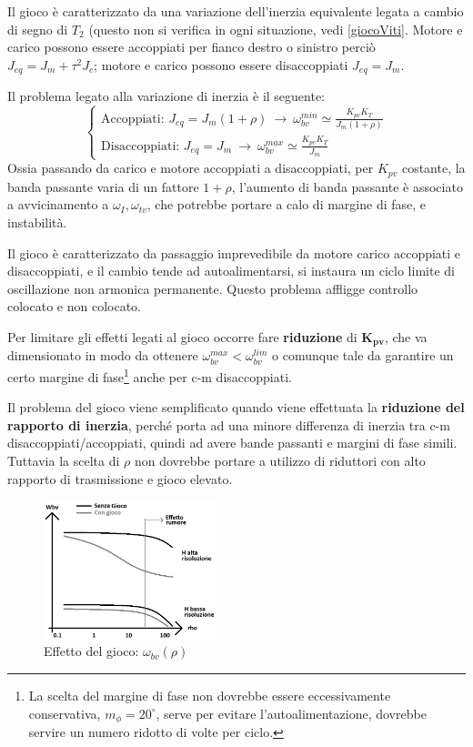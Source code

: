 Il gioco è caratterizzato da una variazione dell'inerzia equivalente legata a cambio di segno di \(T_2\) (questo non si verifica in ogni situazione, vedi \ref{giocoViti}. 
Motore e carico possono essere accoppiati per fianco destro o sinistro perciò \(J_{eq} = J_m + \tau^2 J_c\); motore e carico possono essere disaccoppiati \(J_{eq} = J_m\).

Il problema legato alla variazione di inerzia è il seguente:
\[
\begin{cases}
    \text{Accoppiati: } J_{eq} = J_m (1+\rho) \ \rightarrow \ \omega_{bv}^{min} \simeq \frac{K_{pv}K_T}{J_m(1+\rho)} \\
    \text{Disaccoppiati: } J_{eq} = J_m \ \rightarrow \ \omega_{bv}^{max} \simeq \frac{K_{pv} K_T}{J_m}
\end{cases}
\]
Ossia passando da carico e motore accoppiati a disaccoppiati, per \(K_{pv}\) costante, la banda passante varia di un fattore \(1+\rho\), l'aumento di banda passante è associato a avvicinamento a \(\omega_I,\omega_{tv}\), che potrebbe portare a calo di margine di fase, e instabilità.

Il gioco è caratterizzato da passaggio imprevedibile da motore carico accoppiati e disaccoppiati, e il cambio tende ad autoalimentarsi, si instaura un ciclo limite di oscillazione non armonica permanente.
Questo problema affligge controllo colocato e non colocato.

Per limitare gli effetti legati al gioco occorre fare \textbf{riduzione} di \(\mathbf{K_{pv}}\), che va dimensionato in modo da ottenere \(\omega_{bv}^{max} < \omega_{bv}^{lim}\) o comunque tale da garantire un certo margine di fase\footnote{La scelta del margine di fase non dovrebbe essere eccessivamente conservativa, \(m_\phi = 20^\circ\), serve per evitare l'autoalimentazione, dovrebbe servire un numero ridotto di volte per ciclo.} anche per c-m disaccoppiati.

Il problema del gioco viene semplificato quando viene effettuata la \textbf{riduzione del rapporto di inerzia}, perché porta ad una minore differenza di inerzia tra c-m disaccoppiati/accoppiati, quindi ad avere bande passanti e margini di fase simili.
Tuttavia la scelta di \(\rho\) non dovrebbe portare a utilizzo di riduttori con alto rapporto di trasmissione e gioco elevato.

\begin{figure}[h]
    \centering
    \includegraphics[width=0.45\textwidth]{Immagini/gioco_banda_passante_rho.png}
    \caption{Effetto del gioco: \(\omega_{bv}(\rho)\)}
\end{figure}


